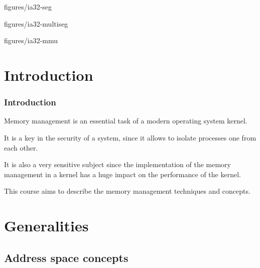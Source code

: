                 {figures/ia32-seg}

                {figures/ia32-multiseg}

                {figures/ia32-mmu}


%
%

\section{Introduction}

\begin{frame}
  \frametitle{Introduction}

  Memory management is an essential task of a modern operating system kernel.

  \-

  It is a key in the security of a system, since it allows to isolate processes one from each other.

  \-

  It is also a very sensitive subject since the implementation of the memory management in a kernel has a huge impact on the performance of the kernel.

  \-

  This course aims to describe the memory management techniques and concepts.

\end{frame}

\section{Generalities}
\subsection{Address space concepts}

